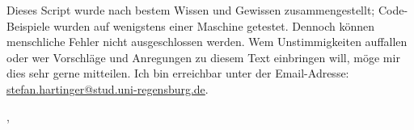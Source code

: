 Dieses Script wurde nach bestem Wissen und Gewissen zusammengestellt; Code-Beispiele wurden auf wenigstens einer Maschine getestet. Dennoch können menschliche Fehler nicht ausgeschlossen werden. Wem Unstimmigkeiten auffallen oder wer Vorschläge und Anregungen zu diesem Text einbringen will, möge mir dies sehr gerne mitteilen. Ich bin erreichbar unter der Email-Adresse:\\ \url{stefan.hartinger@stud.uni-regensburg.de}.
\begin{flushright}
\myName, \myVersionTime
\end{flushright}


\vfill

